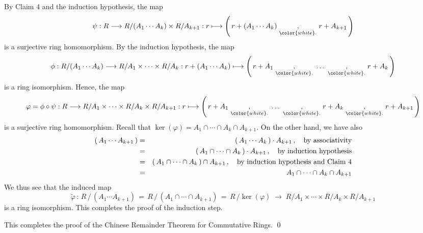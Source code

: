 \begin{enumerate}
	\vskip 0.5cm
	\noindent
	By Claim 4 and the induction hypothesis, the map
	\begin{equation*}
	\psi : R \longrightarrow R / (A_{1} \cdots A_{k}) \times R/A_{k+1}
	: r \longmapsto \left(\,r + (A_{1} \cdots A_{k}) \;\underset{{\color{white}.}}{,}\; r + A_{k+1}\,\right)
	\end{equation*}
	is a surjective ring homomorphism.
	By the induction hypothesis, the map
	\begin{equation*}
	\phi : R / (A_{1} \cdots A_{k}) \longrightarrow R / A_{1} \times \cdots \times R/A_{k}
	: r + (A_{1}\cdots A_{k}) \longmapsto
	\left(\,r + A_{1} \;\underset{{\color{white}.}}{,}\; \ldots \;\underset{{\color{white}.}}{,}\; r + A_{k}\,\right)
	\end{equation*}
	is a ring isomorphism.
	Hence, the map
	\begin{equation*}
	\varphi = \phi \circ \psi : R \longrightarrow R / A_{1} \times \cdots \times R/A_{k} \times R/A_{k+1}
	: r \longmapsto \left(\,
		r + A_{1}
		\;\underset{{\color{white}.}}{,}\;
			\ldots
		\;\underset{{\color{white}.}}{,}\;
			r + A_{k} \;\underset{{\color{white}.}}{,}\; r + A_{k+1}
		\,\right)
	\end{equation*}
	is a surjective ring homomorphism.
	Recall that $\ker(\varphi) = A_{1} \cap \cdots \cap A_{k} \cap A_{k+1}$.
	On the other hand, we have also
	\begin{eqnarray*}
	(\,A_{1} \cdots A_{k+1}\,)
	& = &
		(\,A_{1} \cdots A_{k}\,) \cdot A_{k+1}\,,
		\quad
		\textnormal{by associativity}
	\\
	& = &
		(\,A_{1} \cap \cdots \cap A_{k}\,) \cdot A_{k+1}\,,
		\quad
		\textnormal{by induction hypothesis}
	\\
	& = &
		(\,A_{1} \cap \cdots \cap A_{k}\,) \cap A_{k+1}\,,
		\quad
		\textnormal{by induction hypothesis and Claim 4}
	\\
	& = &
		A_{1} \cap \cdots \cap A_{k} \cap A_{k+1}
	\end{eqnarray*}
	We thus see that the induced map
	\begin{equation*}
	\widetilde{\varphi} \, : \,
		R \,/\, (A_{1} \cdots A_{k+1})
		\,=\,
		R \,/\, (A_{1} \cap \cdots \cap A_{k+1})
		\,=\,
		R \,/ \ker(\varphi)
		\; \longrightarrow \;
		R / A_{1} \times \cdots \times R/A_{k} \times R/A_{k+1}
	\end{equation*}
	is a ring isomorphism. This completes the proof of the induction step.
\end{enumerate}
This completes the proof of the Chinese Remainder Theorem for Commutative Rings.
\qed

